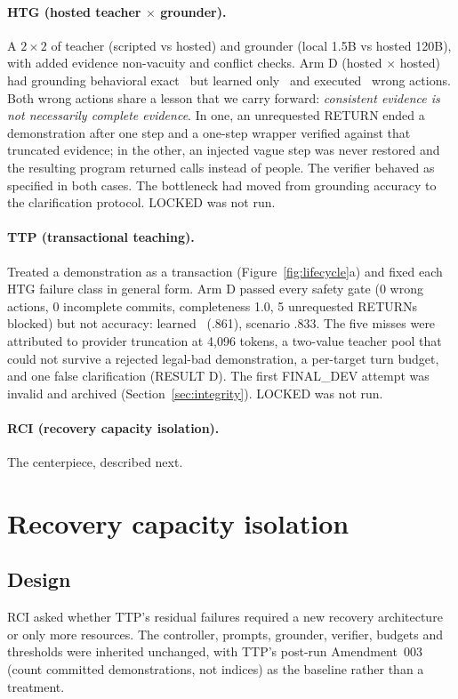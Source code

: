 \documentclass[10pt]{article}
\begin{document}
\paragraph{HTG (hosted teacher $\times$ grounder).} A $2\times2$ of teacher (scripted vs hosted) and grounder (local 1.5B vs hosted 120B), with added evidence non-vacuity and conflict checks. Arm D (hosted $\times$ hosted) had grounding behavioral exact \htgDGround\ but learned only \htgDLearned\ and executed \htgDWrong\ wrong actions. Both wrong actions share a lesson that we carry forward: \emph{consistent evidence is not necessarily complete evidence}. In one, an unrequested RETURN ended a demonstration after one step and a one-step wrapper verified against that truncated evidence; in the other, an injected vague step was never restored and the resulting program returned calls instead of people. The verifier behaved as specified in both cases. The bottleneck had moved from grounding accuracy to the clarification protocol. LOCKED was not run.

\paragraph{TTP (transactional teaching).} Treated a demonstration as a transaction (Figure~\ref{fig:lifecycle}a) and fixed each HTG failure class in general form. Arm D passed every safety gate (0 wrong actions, 0 incomplete commits, completeness 1.0, 5 unrequested RETURNs blocked) but not accuracy: learned \ttpDLearned\ (.861), scenario .833. The five misses were attributed to provider truncation at 4{,}096 tokens, a two-value teacher pool that could not survive a rejected legal-bad demonstration, a per-target turn budget, and one false clarification (RESULT D). The first FINAL\_DEV attempt was invalid and archived (Section~\ref{sec:integrity}). LOCKED was not run.

\paragraph{RCI (recovery capacity isolation).} The centerpiece, described next.

\section{Recovery capacity isolation}\label{sec:rci}

\subsection{Design}
RCI asked whether TTP's residual failures required a new recovery architecture or only more resources. The controller, prompts, grounder, verifier, budgets and thresholds were inherited unchanged, with TTP's post-run Amendment~003 (count committed demonstrations, not indices) as the baseline rather than a treatment.
\end{document}
